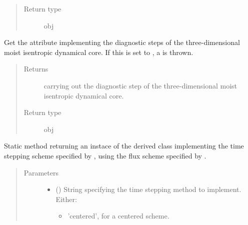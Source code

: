 \documentclass[letterpaper,10pt,english]{sphinxmanual}
\begin{document}
\begin{fulllineitems}
\begin{fulllineitems}
\begin{quote}
\begin{description}
\item[{Return type}] \leavevmode
obj

\end{description}\end{quote}

\end{fulllineitems}


\begin{fulllineitems}
\label{\detokenize{api:dycore.prognostic_isentropic_nonconservative.PrognosticIsentropicNonconservative.diagnostic}}
Get the attribute implementing the diagnostic steps of the three-dimensional moist isentropic dynamical core.
If this is set to , a  is thrown.
\begin{quote}\begin{description}
\item[{Returns}] \leavevmode
{\hyperref[\detokenize{api:dycore.diagnostic_isentropic.DiagnosticIsentropic}]{}} carrying out the diagnostic step of the
three-dimensional moist isentropic dynamical core.

\item[{Return type}] \leavevmode
obj

\end{description}\end{quote}

\end{fulllineitems}


\begin{fulllineitems}
\label{\detokenize{api:dycore.prognostic_isentropic_nonconservative.PrognosticIsentropicNonconservative.factory}}
Static method returning an instace of the derived class implementing the time stepping scheme specified
by , using the flux scheme specified by .
\begin{quote}\begin{description}
\item[{Parameters}] \leavevmode\begin{itemize}
\item {} 
 () \textendash{} 
String specifying the time stepping method to implement. Either:
\begin{itemize}
\item {} 
’centered’, for a centered scheme.


\end{itemize}
\end{itemize}
\end{description}
\end{quote}
\end{fulllineitems}
\end{fulllineitems}
\end{document}

